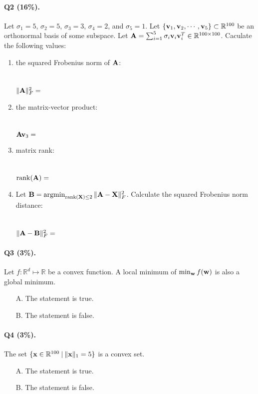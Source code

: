 \documentclass[11pt]{article}
\numberwithin{equation}{section}
\def\A{{\bf A}}
\def\B{{\bf B}}
\def\v{{\bf v}}
\def\w{{\bf w}}
\def\X{{\bf X}}
\def\x{{\bf x}}
\def\RB{{\mathbb R}}
\def\argmin{\mathop{\rm argmin}}
\def\rk{\mathrm{rank}}
\def\argmin{\mathop{\rm argmin}}
\begin{document}
\paragraph{Q2 (16\%).} 
Let $\sigma_1 = 5$, $\sigma_2 = 5$, $\sigma_3 = 3$, $\sigma_4 = 2$, and $\sigma_5 = 1$.
Let $\{ \v_1 , \v_2 , \cdots , \v_5 \} \subset \RB^{100}$ be an orthonormal basis of some subspace.
Let $\A = \sum_{i=1}^{5} \sigma_i \v_i \v_i^T \in \RB^{100\times 100}$.
Caculate the following values:
\begin{enumerate}
	\item 
	the squared Frobenius norm of $\A$:\\ ~\\~\\
	$\| \A \|_F^2 = $
	\vspace{10mm}
	\item 
	the matrix-vector product:\\ ~\\~\\
	$\A \v_3 = $
	\vspace{10mm}
	\item
	matrix rank:\\ ~\\~\\
	$\rk (\A ) = $
	\vspace{10mm}
	\item 
	Let $\B = \argmin_{\rk (\X) \leq 2} \| \A - \X \|_F^2$. 
	Calculate the squared Frobenius norm distance: \\ ~ \\~\\
	$\| \A - \B \|_F^2 = $
	\vspace{10mm}
\end{enumerate}




\paragraph{Q3 (3\%).} 
Let $f: \RB^d \mapsto \RB$ be a convex function.
A local minimum of $\min_{\w} f(\w )$ is also a global minimum.
\begin{itemize}
	\item[A.]
	The statement is true.
	\item[B.]
	The statement is false.
\end{itemize}




\paragraph{Q4 (3\%).} 
The set $\{ \x \in \RB^{100} \: | \: \| \x \|_1 = 5 \} $ is a convex set.
\begin{itemize}
	\item[A.]
	The statement is true.
	\item[B.]
	The statement is false.
\end{itemize}
\end{document}

